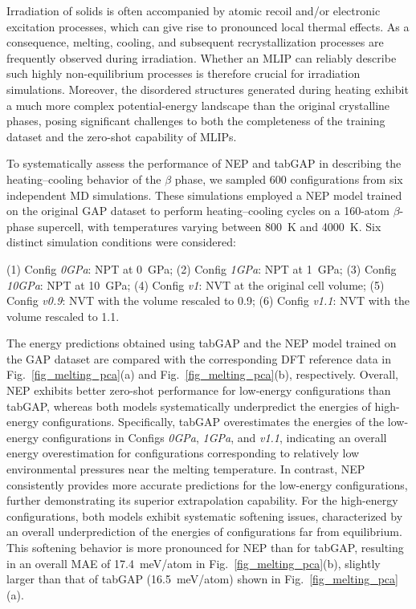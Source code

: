 \documentclass[aip,graphicx,amsmath,amssymb]{revtex4-1}
\begin{document}
Irradiation of solids is often accompanied by atomic recoil and/or electronic excitation
processes, which can give rise to pronounced local thermal effects.
As a consequence, melting, cooling, and subsequent recrystallization processes are
frequently observed during irradiation.
Whether an MLIP can reliably describe such highly non-equilibrium processes is therefore
crucial for irradiation simulations.
Moreover, the disordered structures generated during heating exhibit a much more complex
potential-energy landscape than the original crystalline phases, posing significant
challenges to both the completeness of the training dataset and the zero-shot capability
of MLIPs.

To systematically assess the performance of NEP and tabGAP in describing the
heating--cooling behavior of the $\beta$ phase, we sampled 600 configurations from six
independent MD simulations.
These simulations employed a NEP model trained on the original GAP dataset to perform 
heating--cooling cycles on a 160-atom $\beta$-phase supercell, with temperatures varying 
between 800~K and 4000~K. 
Six distinct simulation conditions were considered:

\noindent
(1) Config \textit{0GPa}: NPT at 0~GPa; \newline
(2) Config \textit{1GPa}: NPT at 1~GPa; \newline
(3) Config \textit{10GPa}: NPT at 10~GPa; \newline
(4) Config \textit{v1}: NVT at the original cell volume; \newline
(5) Config \textit{v0.9}: NVT with the volume rescaled to 0.9; \newline
(6) Config \textit{v1.1}: NVT with the volume rescaled to 1.1. 

The energy predictions obtained using tabGAP and the NEP model trained on the GAP dataset
are compared with the corresponding DFT reference data in
Fig.~\ref{fig_melting_pca}(a) and Fig.~\ref{fig_melting_pca}(b), respectively.
Overall, NEP exhibits better zero-shot performance for low-energy configurations than
tabGAP, whereas both models systematically underpredict the energies of high-energy
configurations.
Specifically, tabGAP overestimates the energies of the low-energy configurations in
Configs \textit{0GPa}, \textit{1GPa}, and \textit{v1.1}, indicating an overall energy
overestimation for configurations corresponding to relatively low environmental pressures
near the melting temperature.
In contrast, NEP consistently provides more accurate predictions for the low-energy
configurations, further demonstrating its superior extrapolation capability.
For the high-energy configurations, both models exhibit systematic softening 
issues,\cite{deng_systematic_2024} characterized by an overall underprediction
of the energies of configurations far from equilibrium.
This softening behavior is more pronounced for NEP than for tabGAP, resulting in an overall
MAE of 17.4~meV/atom in Fig.~\ref{fig_melting_pca}(b), slightly larger than that of tabGAP
(16.5~meV/atom) shown in Fig.~\ref{fig_melting_pca}(a).
\end{document}
